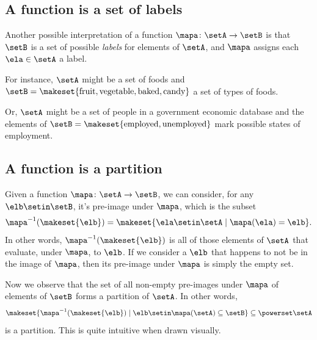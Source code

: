 



\subsection{A function is a set of labels}


Another possible interpretation of a function $\mapa \colon \setA \to \setB$ is that $\setB$ is a set of possible \emph{labels} for elements of $\setA$, and $\mapa$ assigns each $\ela \in \setA$ a label. 

For instance, $\setA$ might be a set of foods and $\setB = \makeset{ \text{fruit}, \text{vegetable}, \text{baked}, \text{candy}}$ a set of types of foods. 

Or, $\setA$ might be a set of people in a government economic database and the elements of $\setB  = \makeset{ \text{employed}, \text{unemployed}}$ mark possible states of employment. 


\subsection{A function is a partition}

Given a function $\mapa \colon \setA \to \setB$, we can consider, for any $\elb \setin \setB$, it's pre-image under $\mapa$, which is the subset 
\begin{equation}
\mapa^{-1}(\makeset{\elb}) = \makeset{ \ela \setin \setA \mid \mapa(\ela) = \elb}.
\end{equation}
In other words, $\mapa^{-1}(\makeset{\elb})$ is all of those elements of $\setA$ that evaluate, under $\mapa$, to $\elb$. If we consider a $\elb$ that happens to not be in the image of $\mapa$, then its pre-image under $\mapa$ is simply the empty set. 

Now we observe that the set of all non-empty pre-images under $\mapa$ of elements of $\setB$ forms a partition of $\setA$. In other words, 
\begin{equation}
\makeset{ \mapa^{-1}(\makeset{\elb}) \mid \elb \setin \mapa(\setA) \subseteq \setB} \subseteq \powerset \setA
\end{equation}
is a partition. This is quite intuitive when drawn visually. 

